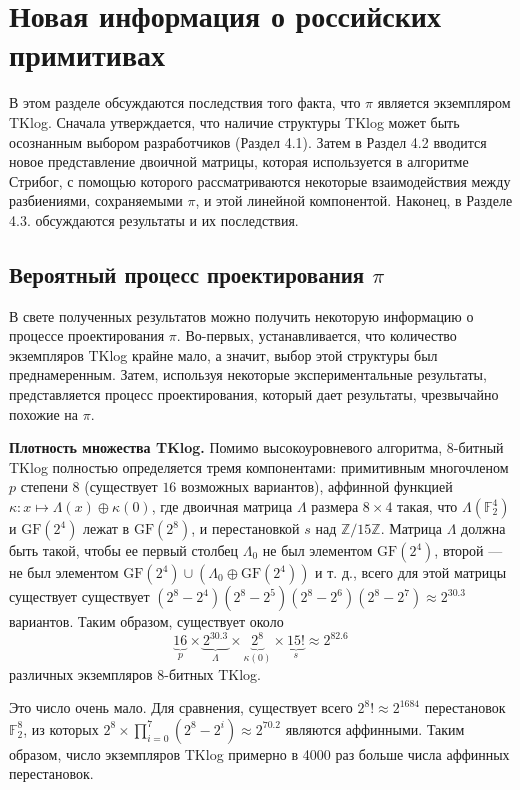 \section{Новая информация о российских примитивах}

В этом разделе обсуждаются последствия того факта, что \(\pi\) является экземпляром TKlog. Сначала утверждается, что наличие структуры TKlog может быть осознанным выбором разработчиков (Раздел 4.1). Затем в Раздел 4.2 вводится новое представление двоичной матрицы, которая используется в алгоритме Стрибог, с помощью которого рассматриваются некоторые взаимодействия между разбиениями, сохраняемыми \(\pi\), и этой линейной компонентой. Наконец, в Разделе 4.3. обсуждаются результаты и их последствия.

\subsection{Вероятный процесс проектирования \(\pi\)}
В свете полученных результатов можно получить некоторую информацию о процессе проектирования \(\pi\). Во-первых, устанавливается, что количество экземпляров TKlog крайне мало, а значит, выбор этой структуры был преднамеренным. Затем, используя некоторые экспериментальные результаты, представляется процесс проектирования, который дает результаты, чрезвычайно похожие на \(\pi\).

\textbf{Плотность множества TKlog.} Помимо высокоуровневого алгоритма, 8-битный TKlog полностью определяется тремя компонентами: примитивным многочленом \(p\) степени $8$ (существует $16$ возможных вариантов), аффинной функцией \(\kappa : x \mapsto \Lambda(x) \oplus \kappa(0)\), где двоичная матрица \(\Lambda\) размера \(8 \times 4\) такая, что \(\Lambda(\mathbb{F}_{2}^{4})\) и \(\text{GF}(2^4)\) лежат в \(\text{GF}(2^8)\), и перестановкой \(s\) над \(\mathbb{Z}/15\mathbb{Z}\). Матрица \(\Lambda\) должна быть такой, чтобы ее первый столбец \(\Lambda_0\) не был элементом \(\text{GF}(2^4)\), второй — не был элементом \(\text{GF}(2^4) \cup (\Lambda_0 \oplus \text{GF}(2^4))\) и т. д., всего для этой матрицы существует существует \((2^8 - 2^4)(2^8 - 2^5)(2^8 - 2^6)(2^8 - 2^7) \approx 2^{30.3}\) вариантов. Таким образом, существует около
\[
  \underbrace{16}_{p} \times \underbrace{2^{30.3}}_{\Lambda} \times \underbrace{2^8}_{\kappa(0)} \times \underbrace{15!}_{s} \approx 2^{82.6}
\]
различных экземпляров 8-битных TKlog.

Это число очень мало. Для сравнения, существует всего \(2^8! \approx 2^{1684}\) перестановок \(\mathbb{F}_2^8\), из которых \(2^8 \times \prod_{i=0}^{7}(2^8 - 2^i) \approx 2^{70.2}\) являются аффинными. Таким образом, число экземпляров TKlog примерно в 4000 раз больше числа аффинных перестановок.

